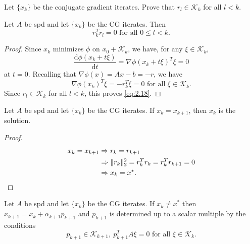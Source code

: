 \begin{lemma}
  Let $\{x_k\}$ be the conjugate gradient iterates. Prove that
  $r_l\in \mathcal{K}_k$ for all $l<k$.
\end{lemma}

\begin{lemma}
  Let $A$ be spd and let $\{x_k\}$ be the CG iterates. Then
  \begin{equation}
    \label{eq:2.18}
    r_k^Tr_l=0\text{ for all }0\leq l < k.
  \end{equation}
\end{lemma}

\begin{proof}
  Since $x_k$ minimizes $\phi$ on $x_0+\mathcal{K}_k$, we have, for
  any $\xi\in\mathcal{K}_k,$
  $$\frac{\mathrm{d}\phi(x_k+t\xi)}{\mathrm{d}t}=\nabla\phi(x_k+t\xi)^T\xi=0$$
  at $t=0$. Recalling that $\nabla\phi(x)=Ax-b=-r$, we have
  \begin{equation}
    \label{eq:2.19}
    \nabla\phi(x_k)^T\xi=-r_k^T\xi=0\text{ for all }\xi\in\mathcal{K}_k.
  \end{equation}
  Since $r_l\in\mathcal{K}_k$ for all $l<k$, this proves \eqref{eq:2.18}.
\end{proof}

\begin{coro}
  Let $A$ be spd and let $\{x_k\}$ be the CG iterates. If
  $x_k=x_{k+1}$, then $x_k$ is the solution.
\end{coro}
\begin{proof}
  \begin{equation*}
    \begin{split}
      x_k=x_{k+1}&\Rightarrow r_{k}=r_{k+1}\\
      &\Rightarrow \|r_k\|_2^2=r_k^Tr_k=r_k^Tr_{k+1}=0 \\
      &\Rightarrow x_k=x^*.\qedhere
    \end{split}
  \end{equation*}
\end{proof}

\begin{lemma}
  Let $A$ be spd and let $\{x_k\}$ be the CG iterates. If $x_k\neq
  x^*$ then $x_{k+1}=x_k+\alpha_{k+1}p_{k+1}$ and $p_{k+1}$ is
  determined up to a scalar multiple by the conditions
  \begin{equation}
    \label{eq:2.20}
    p_{k+1}\in\mathcal{K}_{k+1},\ p_{k+1}^TA\xi=0\text{ for all }\xi\in\mathcal{K}_k.
  \end{equation}
\end{lemma}

